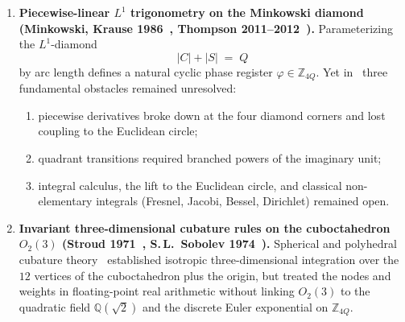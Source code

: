 \documentclass[11pt,a4paper]{article}
\theoremstyle{plain}
\theoremstyle{definition}
\begin{document}
\begin{enumerate}[label=\textbf{(\arabic*)},leftmargin=*]
\item \textbf{Piecewise-linear $L^1$ trigonometry on the Minkowski diamond (Minkowski, Krause 1986~\cite{Krause1986}, Thompson 2011--2012~\cite{Thompson2011,Thompson2012}).}
  Parameterizing the $L^1$-diamond
  \begin{equation}
    \label{eq:intro-l1-diamond}
    |C| + |S| \;=\; Q
  \end{equation}
  by arc length defines a natural cyclic phase register $\varphi \in \mathbb{Z}_{4Q}$. Yet in~\cite{Thompson2011,Thompson2012} three fundamental obstacles remained unresolved:
  \begin{enumerate}[label=(\alph*)]
  \item piecewise derivatives broke down at the four diamond corners and lost coupling to the Euclidean circle;
  \item quadrant transitions required branched powers of the imaginary unit;
  \item integral calculus, the lift to the Euclidean circle, and classical non-elementary integrals (Fresnel, Jacobi, Bessel, Dirichlet) remained open.
  \end{enumerate}

\item \textbf{Invariant three-dimensional cubature rules on the cuboctahedron $O_2(3)$ (Stroud 1971~\cite{Stroud1971}, S.\,L.~Sobolev 1974~\cite{Sobolev1974}).}
  Spherical and polyhedral cubature theory~\cite{Sobolev1974,Stroud1971} established isotropic three-dimensional integration over the $12$ vertices of the cuboctahedron plus the origin, but treated the nodes and weights in floating-point real arithmetic without linking $O_2(3)$ to the quadratic field $\mathbb{Q}(\sqrt{2})$ and the discrete Euler exponential on $\mathbb{Z}_{4Q}$.
\end{enumerate}
\end{document}
